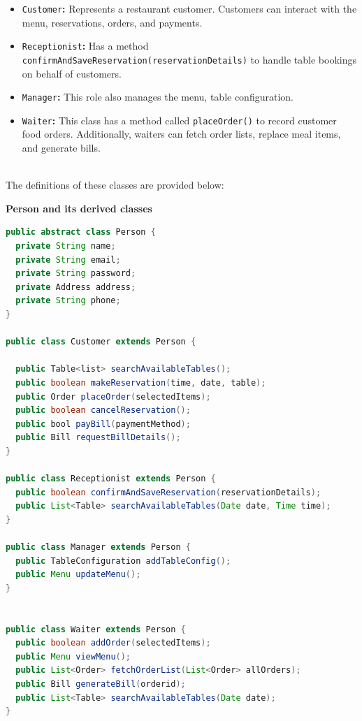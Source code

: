 \begin{itemize}
\item
\protect{}\label{CA7E9WFHWOcBKOkVdaoo9}
\texttt{Customer}\textbf{:} Represents a restaurant customer. Customers can interact with the menu, reservations, orders, and payments.
\item
\protect{}\label{5YVMiADoJuan64iY9fa1A}
\texttt{Receptionist}\textbf{:} Has a method \texttt{confirmAndSaveReservation(reservationDetails)} to handle table bookings on behalf of customers.
\item
\protect{}\label{bQXxse-30gKtOR0wq0Bo-}
\texttt{Manager}\textbf{:} This role also manages the menu, table configuration.
\item
\protect{}\label{R41yEcrNoMoErOS7umeMU}
\texttt{Waiter}\textbf{:} This class has a method called \texttt{placeOrder()} to record customer food orders. Additionally, waiters can fetch order lists, replace meal items, and generate bills.
\end{itemize}
\\
The definitions of these classes are provided below:

\textbf{Person and its derived classes}

\begin{lstlisting}[language=Java]
public abstract class Person {
  private String name;
  private String email;
  private String password;
  private Address address;
  private String phone; 
}

public class Customer extends Person {
  
  public Table<list> searchAvailableTables(); 
  public boolean makeReservation(time, date, table);
  public Order placeOrder(selectedItems);
  public boolean cancelReservation();
  public bool payBill(paymentMethod);
  public Bill requestBillDetails(); 
}

public class Receptionist extends Person {
  public boolean confirmAndSaveReservation(reservationDetails);
  public List<Table> searchAvailableTables(Date date, Time time);
}

public class Manager extends Person {
  public TableConfiguration addTableConfig();
  public Menu updateMenu();
}


public class Waiter extends Person {
  public boolean addOrder(selectedItems);
  public Menu viewMenu();
  public List<Order> fetchOrderList(List<Order> allOrders);
  public Bill generateBill(orderid);
  public List<Table> searchAvailableTables(Date date);
}
\end{lstlisting}

